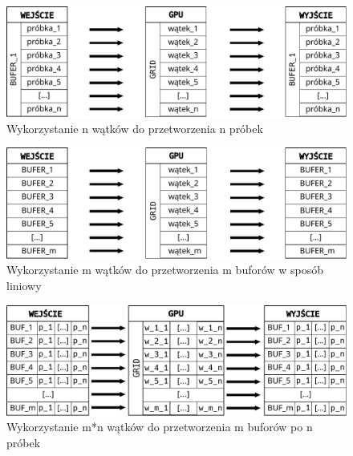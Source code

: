 \begin{figure}
    \centering
    \includegraphics[width=\textwidth]{./fig/przetwarzanie_1_do_1.pdf}
    \caption{Wykorzystanie n wątków do przetworzenia n próbek}
    \label{fig:Wykorzystanie n wątków do przetworzenia n próbek}
\end{figure}

\begin{figure}
    \centering
    \includegraphics[width=\textwidth]{./fig/przetwarzanie_m_do_1.pdf}
    \caption{Wykorzystanie m wątków do przetworzenia m buforów w sposób liniowy}
    \label{fig:Wykorzystanie m wątków do przetworzenia m buforów}
\end{figure}

\begin{figure}
    \centering
    \includegraphics[width=\textwidth]{./fig/przetwarzanie_m_do_m.pdf}
    \caption{Wykorzystanie m*n wątków do przetworzenia m buforów po n próbek}
    \label{fig:Wykorzystanie m*n wątków do przetworzenia m buforów po n próbek}
\end{figure}